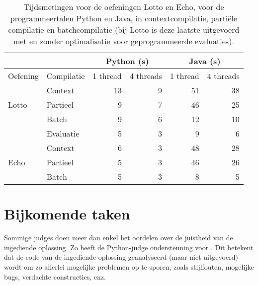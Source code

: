 \begin{table}
    \centering
    \begin{tabular}{ll|r|r|r|r|}
        \cline{3-6}
        & & \multicolumn{2}{c|}{Python (s)} & \multicolumn{2}{c|}{Java (s)}  \\
        \hline
        \multicolumn{1}{|l|}{Oefening}               & Compilatie & 1 thread & 4 threads & 1 thread & 4 threads \\
        \hline
        \multicolumn{1}{|l|}{\multirow{3}{*}{Lotto}} & Context    & 13       & 9         & 51       & 38        \\
        \multicolumn{1}{|l|}{}                       & Partieel   & 9        & 7         & 46       & 25        \\
        \multicolumn{1}{|l|}{}                       & Batch      & 9        & 6         & 12       & 10        \\
        \multicolumn{1}{|l|}{}                       & Evaluatie  & 5        & 3         & 9        & 6         \\
        \hline
        \multicolumn{1}{|l|}{\multirow{3}{*}{Echo}}  & Context    & 6        & 3         & 48       & 28        \\
        \multicolumn{1}{|l|}{}                       & Partieel   & 5        & 3         & 46       & 26        \\
        \multicolumn{1}{|l|}{}                       & Batch      & 5        & 3         & 8        & 5         \\
        \hline
    \end{tabular}
    \caption{Tijdsmetingen voor de oefeningen Lotto en Echo, voor de programmeertalen Python en Java, in contextcompilatie, partiële compilatie en batchcompilatie (bij Lotto is deze laatste uitgevoerd met en zonder optimalisatie voor geprogrammeerde evaluaties).}
    \label{tab:meting}
\end{table}

\section{Bijkomende taken}\label{sec:andere-taken}

Sommige judges doen meer dan enkel het oordelen over de juistheid van de ingediende oplossing.
Zo heeft de Python-judge ondersteuning voor .
Dit betekent dat de code van de ingediende oplossing geanalyseerd (maar niet uitgevoerd) wordt om zo allerlei mogelijke problemen op te sporen, zoals stijlfouten, mogelijke bugs, verdachte constructies, enz.

